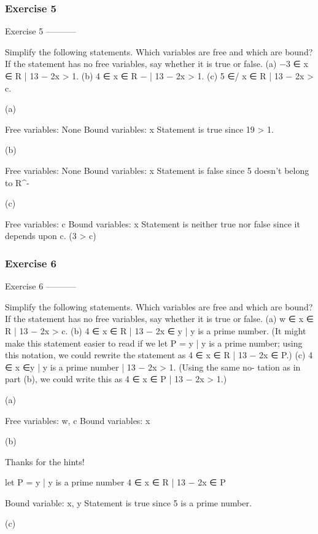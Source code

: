 \subsubsection{Exercise 5}
Exercise 5
-----------

    Simplify the following statements. Which variables are free and which are
    bound? If the statement has no free variables, say whether it is true or
    false.
    (a) −3 ∈ {x ∈ R | 13 − 2x > 1}.
    (b) 4 ∈ {x ∈ R − | 13 − 2x > 1}.
    (c) 5 ∈/ {x ∈ R | 13 − 2x > c}.

(a)

    Free variables: None
    Bound variables: x
    Statement is true since 19 > 1.

(b)

    Free variables: None
    Bound variables: x
    Statement is false since 5 doesn't belong to R^-

(c)

    Free variables: c
    Bound variables: x
    Statement is neither true nor false since it depends upon c. (3 >
    c)

\subsubsection{Exercise 6}
Exercise 6
-----------

    Simplify the following statements. Which variables are free and which are
    bound? If the statement has no free variables, say whether it is true or
    false.
    (a) w ∈ {x ∈ R | 13 − 2x > c}.
    (b) 4 ∈ {x ∈ R | 13 − 2x ∈ {y | y is a prime number}}. (It might make
    this statement easier to read if we let P = {y | y is a prime number};
    using this notation, we could rewrite the statement as 4 ∈ {x ∈ R |
    13 − 2x ∈ P}.)
    (c) 4 ∈ {x  ∈{y | y is a prime number} | 13 − 2x > 1}. (Using the same no-
    tation as in part (b), we could write this as 4 ∈ {x ∈ P | 13 − 2x > 1}.)

(a)

    Free variables: w, c
    Bound variables: x

(b)

Thanks for the hints!

    let P = {y | y is a prime number}
    4 ∈ {x ∈ R | 13 − 2x ∈ P}

    Bound variable: x, y
    Statement is true since 5 is a prime number.

(c)

